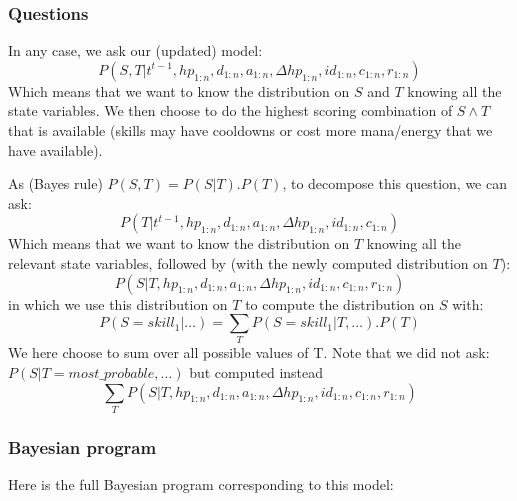 \subsubsection{Questions}

In any case, we ask our (updated) model:\\
\begin{equation}
P(S,T|t^{t-1},hp_{1:n},d_{1:n}, a_{1:n}, \Delta hp_{1:n}, id_{1:n}, c_{1:n}, r_{1:n})
\end{equation}
Which means that we want to know the distribution on $S$ and $T$ knowing all the state variables. We then choose to do the highest scoring combination of $S \wedge T$ that is available (skills may have cooldowns or cost more mana/energy that we have available).

As (Bayes rule) $P(S,T) = P(S|T).P(T)$, to decompose this question, we can ask:
$$P(T | t^{t-1}, hp_{1:n},d_{1:n}, a_{1:n}, \Delta hp_{1:n}, id_{1:n}, c_{1:n})$$ 
Which means that we want to know the distribution on $T$ knowing all the relevant state variables, followed by (with the newly computed distribution on $T$):
$$P(S | T, hp_{1:n},d_{1:n}, a_{1:n}, \Delta hp_{1:n}, id_{1:n}, c_{1:n}, r_{1:n})$$ 
in which we use this distribution on $T$ to compute the distribution on $S$ with:
$$P(S=skill_1 | \dots) = \sum_T P(S=skill_1 | T, \dots).P(T)$$
We here choose to sum over all possible values of T. Note that we did not ask:\\
$P(S|T=most\_probable , \dots)$ but computed instead
$$\sum_T P(S|T,hp_{1:n},d_{1:n}, a_{1:n}, \Delta hp_{1:n}, id_{1:n}, c_{1:n}, r_{1:n})$$


\subsubsection{Bayesian program}
Here is the full Bayesian program corresponding to this model:

